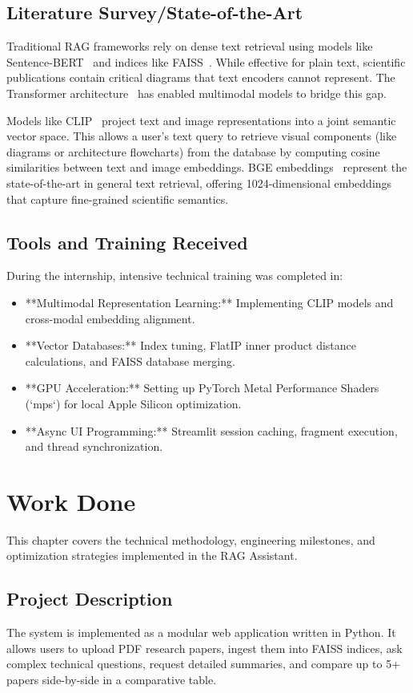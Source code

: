 \documentclass[12pt]{report}
\begin{document}
{\section{Literature Survey/State-of-the-Art}
Traditional RAG frameworks rely on dense text retrieval using models like Sentence-BERT~\cite{reimers2019sentence} and indices like FAISS~\cite{johnson2019billion}. While effective for plain text, scientific publications contain critical diagrams that text encoders cannot represent. The Transformer architecture~\cite{vaswani2017attention} has enabled multimodal models to bridge this gap. 

Models like CLIP~\cite{radford2021learning} project text and image representations into a joint semantic vector space. This allows a user's text query to retrieve visual components (like diagrams or architecture flowcharts) from the database by computing cosine similarities between text and image embeddings. BGE embeddings~\cite{xiao2023bge} represent the state-of-the-art in general text retrieval, offering 1024-dimensional embeddings that capture fine-grained scientific semantics.

\section{Tools and Training Received}
During the internship, intensive technical training was completed in:
\begin{itemize}
    \item **Multimodal Representation Learning:** Implementing CLIP models and cross-modal embedding alignment.
    \item **Vector Databases:** Index tuning, FlatIP inner product distance calculations, and FAISS database merging.
    \item **GPU Acceleration:** Setting up PyTorch Metal Performance Shaders (`mps`) for local Apple Silicon optimization.
    \item **Async UI Programming:** Streamlit session caching, fragment execution, and thread synchronization.
\end{itemize}

\chapter{Work Done}
This chapter covers the technical methodology, engineering milestones, and optimization strategies implemented in the RAG Assistant.

\section{Project Description}
The system is implemented as a modular web application written in Python. It allows users to upload PDF research papers, ingest them into FAISS indices, ask complex technical questions, request detailed summaries, and compare up to 5+ papers side-by-side in a comparative table.

}
\end{document}

